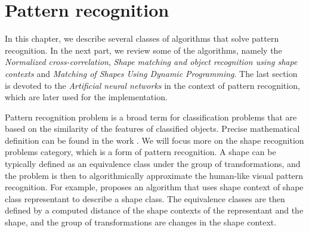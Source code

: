 \chapter{Pattern recognition}
In this chapter, we describe several classes of algorithms that solve pattern recognition. In the next part, we review some of the algorithms, namely the \emph{Normalized cross-correlation}, \emph{Shape matching and object recognition using shape contexts} and \emph{Matching of Shapes Using Dynamic Programming}. The last section is devoted to the \emph{Artificial neural networks} in the context of pattern recognition, which are later used for the implementation.

Pattern recognition problem is a broad term for classification problems that are based on the similarity of the features of classified objects. Precise mathematical definition can be found in the work \citet{formalMethods}. We will focus more on the shape recognition problems category, which is a form of pattern recognition. A shape can be typically defined as an equivalence class under the group of transformations, and the problem is then to algorithmically approximate the human-like visual pattern recognition. 
For example, \citet{simple} proposes an algorithm that uses shape context of shape class representant to describe a shape class. The equivalence classes are then defined by a computed distance of the shape contexts of the representant and the shape, and the group of transformations are changes in the shape context.

